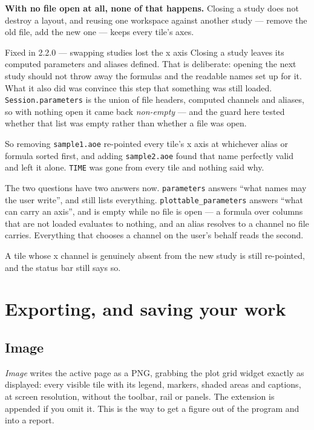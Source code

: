 \documentclass[11pt,a4paper,oneside]{report}
\newcommand{\appver}{2.2.0}
\newcommand{\code}[1]{\texttt{#1}}
\begin{document}
\textbf{With no file open at all, none of that happens.} Closing a study does
not destroy a layout, and reusing one workspace against another study --- remove
the old file, add the new one --- keeps every tile's axes.

\begin{aoenew}{Fixed in \appver{} --- swapping studies lost the x axis}
Closing a study leaves its computed parameters and aliases defined. That is
deliberate: opening the next study should not throw away the formulas and the
readable names set up for it. What it also did was convince this step that
something was still loaded. \code{Session.parameters} is the union of file
headers, computed channels and aliases, so with nothing open it came back
\emph{non-empty} --- and the guard here tested whether that list was empty
rather than whether a file was open.

So removing \code{sample1.aoe} re-pointed every tile's x axis at whichever
alias or formula sorted first, and adding \code{sample2.aoe} found that name
perfectly valid and left it alone. \code{TIME} was gone from every tile and
nothing said why.

The two questions have two answers now. \code{parameters} answers ``what names
may the user write'', and still lists everything. \code{plottable\_parameters}
answers ``what can carry an axis'', and is empty while no file is open --- a
formula over columns that are not loaded evaluates to nothing, and an alias
resolves to a channel no file carries. Everything that chooses a channel on the
user's behalf reads the second.
\end{aoenew}

A tile whose x channel is genuinely absent from the new study is still
re-pointed, and the status bar still says so.

\chapter{Exporting, and saving your work}

\section{Image}

\emph{Image} writes the active page as a PNG, grabbing the plot grid widget
exactly as displayed: every visible tile with its legend, markers, shaded areas
and captions, at screen resolution, without the toolbar, rail or panels. The
extension is appended if you omit it. This is the way to get a figure out of the
program and into a report.
\end{document}
